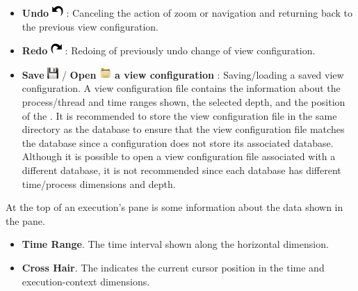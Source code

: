 \begin{itemize}
\item \textbf{Undo} \includegraphics[scale=.5]{fig/hpctraceviewer-button-undo.png} : Canceling the action of zoom or navigation and returning back to the previous view configuration.
\item \textbf{Redo} \includegraphics[scale=.5]{fig/hpctraceviewer-button-redo.png} : Redoing of previously undo change of view configuration.
\item \textbf{Save} \includegraphics[scale=.5]{fig/hpctraceviewer-button-save.png}  / \textbf{Open \includegraphics[scale=.7]{fig/hpctraceviewer-button-open.png} a view configuration} : Saving/loading a saved view configuration.
A view configuration file contains the information about the process/thread and time ranges shown, the selected depth, and the position of the \crosshair{}.
It is recommended to store the view configuration file in the same directory as the database to ensure that the view configuration file matches the database since a configuration does not store its associated database.
Although it is possible to open a view configuration file associated with a different database, it is not recommended since each database has different time/process dimensions and depth.


\end{itemize}

At the top of an execution's \traceview{} pane is some information about the data shown in the pane.
\begin{itemize}
 \item \textbf{Time Range}. The time interval shown along the horizontal dimension.
 \item \textbf{Cross Hair}. The \crosshair{} indicates the current cursor position in the time and execution-context dimensions.
\end{itemize}

\subsection{\depthview}
\label{sec:depthview}

